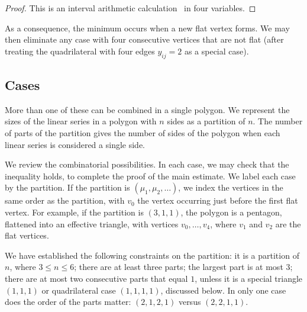 \begin{proof} This is an interval arithmetic calculation~\cite[cc:qua]{hales:2009:nonlinear} in four variables.%
\end{proof}

As a consequence, the minimum occurs when a new flat vertex forms.  We may then eliminate any case with four consecutive vertices that are not flat (after treating the quadrilateral with four edges $y_{ij}=2$ as a special case).

\subsection{Cases}

More than one of these can be combined in a single polygon.  We represent the sizes of the linear series in a polygon with $n$ sides as a partition of $n$.
The number of parts of the partition gives the number of sides of the polygon when each linear series is considered a single side. 


We review the combinatorial possibilities.  In each case, we may check that the inequality holds, to complete the proof of the main estimate.  We label each 
case by the partition.  If the partition is $(\mu_1,\mu_2,\ldots)$, we
index the vertices in the same order as the partition, with $v_0$
the vertex occurring just before the first flat vertex.  For example,
if the partition is $(3,1,1)$, the polygon is a pentagon, flattened into
an effective triangle, with vertices $v_0,\ldots,v_4$, where $v_1$ and $v_2$
are the flat vertices.

We have established the following constraints on the partition: it is
a partition of $n$, where $3\le n\le 6$; there
are at least three parts; the largest part is at most $3$;  there are
at most two consecutive parts that equal $1$, unless it is a special triangle $(1,1,1)$ or
quadrilateral case $(1,1,1,1)$, discussed below.  In only one case
does the order of the parts matter: $(2,1,2,1)$ versus $(2,2,1,1)$.


